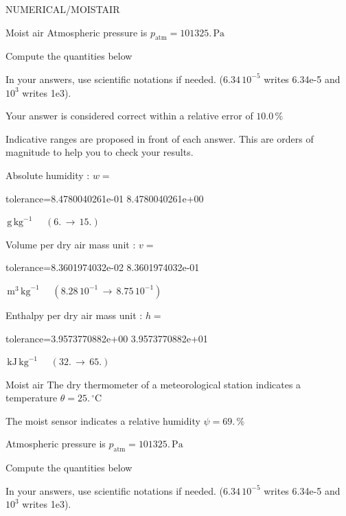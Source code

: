 \documentclass[12pt]{article}
\begin{document}
\begin{quiz}{NUMERICAL/MOISTAIR}
\begin{cloze}{Moist air}
Atmospheric pressure is $p_{\text{atm}} = 101325.\,  \mathrm{Pa} $

 

Compute the quantities below

In your answers, use scientific notations if needed.  ($6.34\, 10^{-5}$ writes 6.34e-5 and $10^{3}$ writes 1e3).

Your answer is considered correct within a relative error of $10.0\, \% $

Indicative ranges are proposed in front of each answer. This are orders of magnitude to help you to check your results.

Absolute humidity : $w =  $
\begin{numerical}[points=1] 
\item[tolerance={8.4780040261e-01}] 8.4780040261e+00 
\end{numerical} 
 $\,  \mathrm{g}\,  \mathrm{kg}^{-1}$ 
 $ \quad (6. \, \rightarrow \, 15.) $ 

Volume per dry air mass unit : $v =  $
\begin{numerical}[points=1] 
\item[tolerance={8.3601974032e-02}] 8.3601974032e-01 
\end{numerical} 
 $\,  \mathrm{m}^{3}\,  \mathrm{kg}^{-1}$ 
 $ \quad ( 8.28 \, 10^{-1}  \, \rightarrow \,  8.75 \, 10^{-1} ) $ 

Enthalpy per dry air mass unit : $h =  $
\begin{numerical}[points=2] 
\item[tolerance={3.9573770882e+00}] 3.9573770882e+01 
\end{numerical} 
 $\,  \mathrm{kJ}\,  \mathrm{kg}^{-1}$ 
 $ \quad (32. \, \rightarrow \, 65.) $ 

\end{cloze} 


 \begin{cloze}{Moist air} 
The dry thermometer of a meteorological station indicates a temperature $\theta = 25.\,  \mathrm{^\circ\mathrm{C}} $

The moist sensor indicates a relative humidity $\psi = 69.\, \% $

Atmospheric pressure is $p_{\text{atm}} = 101325.\,  \mathrm{Pa} $

 

Compute the quantities below

In your answers, use scientific notations if needed.  ($6.34\, 10^{-5}$ writes 6.34e-5 and $10^{3}$ writes 1e3).


\end{cloze}
\end{quiz}
\end{document}
